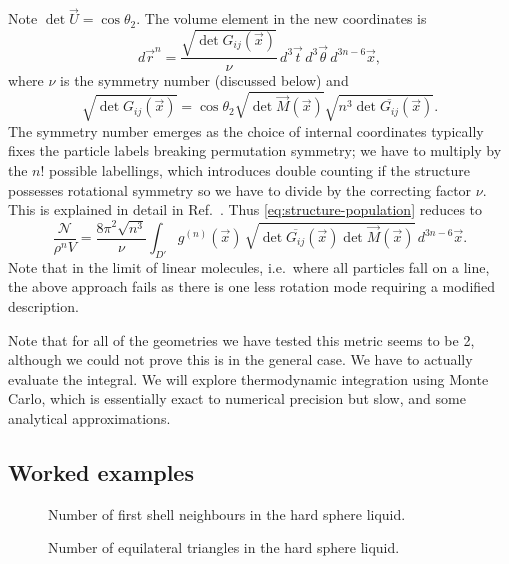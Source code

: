 \documentclass[11pt,twoside]{report}
\begin{document}
Note $\det{\vec{U}} = \cos{\theta_2}$.
The volume element in the new coordinates is
\begin{equation}
  d\vec{r}^n = \frac{\sqrt{\det G_{ij}(\vec{x})}}{\nu}
  \, d^3 \vec{t} \, d^3 \vec{\theta} \, d^{3n-6} \vec{x},
\end{equation}
where $\nu$ is the symmetry number (discussed below) and
\begin{equation}
  \sqrt{\det G_{ij}(\vec{x})} =
  \cos{\theta_2} \sqrt{\det{\vec{M}(\vec{x})}}
  \sqrt{n^3 \det{\overline{G_{ij}}(\vec{x})}}.
\end{equation}
The symmetry number emerges as the choice of internal coordinates typically fixes the particle labels breaking permutation symmetry; we have to multiply by the $n!$ possible labellings, which introduces double counting if the structure possesses rotational symmetry so we have to divide by the correcting factor $\nu$.
This is explained in detail in Ref.\ \cite{CatesSM2015}.
Thus \eqref{eq:structure-population} reduces to
\begin{equation}\label{eq:structural-partition-function-detailed}
  \frac{\mathcal{N}}{\rho^n V}
  =
  \frac{8\pi^2 \sqrt{n^3}}{\nu} \int_{D'}
  g^{(n)}(\vec{x}) \,
  \sqrt{\det{\overline{G_{ij}}(\vec{x})} \det{\vec{M}(\vec{x})}}
  \, d^{3n-6} \vec{x}.
\end{equation}
Note that in the limit of linear molecules, i.e.\ where all particles fall on a line, the above approach fails as there is one less rotation mode requiring a modified description.

Note that for all of the geometries we have tested this metric seems to be 2, although we could not prove this is in the general case.
We have to actually evaluate the integral.
We will explore thermodynamic integration using Monte Carlo, which is essentially exact to numerical precision but slow, and some analytical approximations.

\subsection{Worked examples}

\begin{figure}
  \missingfigure[figwidth=\linewidth]{}
  \caption{Number of first shell neighbours in the hard sphere liquid.}
\end{figure}

\begin{figure}
  \missingfigure[figwidth=\linewidth]{}
  \caption{Number of equilateral triangles in the hard sphere liquid.}
\end{figure}
\end{document}
